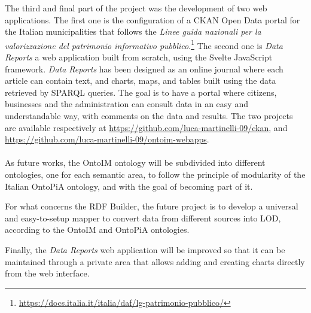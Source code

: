The third and final part of the project was the development of two web applications. The first one is the configuration of a CKAN Open Data portal for the Italian municipalities that follows the \textit{Linee guida nazionali per la valorizzazione del patrimonio informativo pubblico}.\footnote{\url{https://docs.italia.it/italia/daf/lg-patrimonio-pubblico/}} The second one is \textit{Data Reports} a web application built from scratch, using the Svelte JavaScript framework. \textit{Data Reports} has been designed as an online journal where each article can contain text, and charts, maps, and tables built using the data retrieved by \ac{SPARQL} queries. The goal is to have a portal where citizens, businesses and the administration can consult data in an easy and understandable way, with comments on the data and results. The two projects are available respectively at \url{https://github.com/luca-martinelli-09/ckan}, and \url{https://github.com/luca-martinelli-09/ontoim-webapps}.

\paragraph*{}

As future works, the \ac{OntoIM} ontology will be subdivided into different ontologies, one for each semantic area, to follow the principle of modularity of the Italian OntoPiA ontology, and with the goal of becoming part of it.

For what concerns the \ac{RDF} Builder, the future project is to develop a universal and easy-to-setup mapper to convert data from different sources into \acl{LOD}, according to the \ac{OntoIM} and OntoPiA ontologies.

Finally, the \textit{Data Reports} web application will be improved so that it can be maintained through a private area that allows adding and creating charts directly from the web interface.